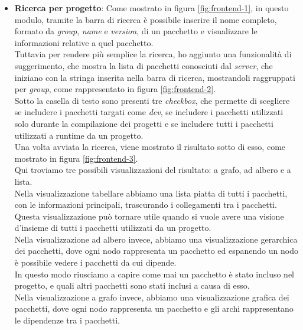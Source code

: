 \begin{itemize}
  \item \textbf{Ricerca per progetto}: Come mostrato in figura \ref*{fig:frontend-1}, in questo modulo, tramite la barra di ricerca
   è possibile inserire il nome completo, formato da \textit{group}, \textit{name} e \textit{version}, di un pacchetto e visualizzare
    le informazioni relative a quel pacchetto.\\
    Tuttavia per rendere più semplice la ricerca, ho aggiunto una funzionalità di suggerimento, che mostra la lista di pacchetti conosciuti dal 
    \textit{server}, che iniziano con la stringa inserita nella barra di ricerca, mostrandoli raggruppati per \textit{group}, come rappresentato in figura \ref*{fig:frontend-2}.\\
    Sotto la casella di testo sono presenti tre \textit{checkbox}, che permette di scegliere se includere i pacchetti targati come \textit{dev}, 
    se includere i pacchetti utilizzati solo durante la compilazione dei progetti e se includere tutti i pacchetti utilizzati a runtime
    da un progetto.\\
    Una volta avviata la ricerca, viene mostrato il risultato sotto di esso, come mostrato in figura \ref*{fig:frontend-3}.\\
    Qui troviamo tre possibili visualizzazioni del risultato: a grafo, ad albero e a lista.\\
    Nella visualizzazione tabellare abbiamo una lista piatta di tutti i pacchetti, con le informazioni principali, trascurando i collegamenti tra i pacchetti.\\
    Questa visualizzazione può tornare utile quando si vuole avere una visione d'insieme di tutti i pacchetti utilizzati da un progetto.\\
    Nella visualizzazione ad albero invece, abbiamo una visualizzazione gerarchica dei pacchetti, dove ogni nodo rappresenta un pacchetto ed espanendo un nodo
    è possibile vedere i pacchetti da cui dipende.\\
    In questo modo riusciamo a capire come mai un pacchetto è stato incluso nel progetto, e quali altri pacchetti sono stati inclusi a causa di esso.\\
    Nella visualizzazione a grafo invece, abbiamo una visualizzazione grafica dei pacchetti, dove ogni nodo rappresenta un pacchetto e gli archi rappresentano
    le dipendenze tra i pacchetti.\\
    \begin{figure}[h]
      \centering
      \begin{minipage}{0.60\textwidth}

\end{minipage}
\end{figure}
\end{itemize}
